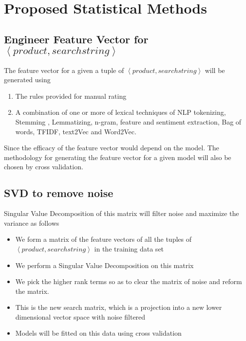 \documentclass[twoside,12pt]{article}
\newcommand{\tuple}[1]{\ensuremath{\left \langle #1 \right \rangle }}
\begin{document}
\section{Proposed Statistical Methods}
\label{Proposed Method}

\subsection{Engineer Feature Vector for \tuple{product,searchstring}}
The feature vector for a given a tuple of \tuple{product,searchstring} will be generated using 
\begin{enumerate}
\item
The rules provided for manual rating 
\item
A combination of one or more of lexical techniques of NLP tokenizing, Stemming , Lemmatizing, n-gram, feature and sentiment extraction, Bag of words, TFIDF, text2Vec and Word2Vec.
\end{enumerate}
Since the efficacy of the feature vector would depend on the model. The methodology for generating the feature vector for a given model will also be chosen by cross validation.


\subsection{SVD to remove noise}
Singular Value Decomposition of this matrix will filter noise and maximize the variance as follows
\begin{itemize}
\item
We form a matrix of the feature vectors of all the tuples of \tuple{product,searchstring} in the training data set
\item
We perform a Singular Value Decomposition on this matrix
\item
We pick the higher rank terms so as to clear the matrix of noise and reform the matrix. 
\item
This is the new search matrix, which is a projection into a new lower dimensional vector space with noise filtered
\item
Models will be fitted on this data using cross validation
\end{itemize}
\end{document}
